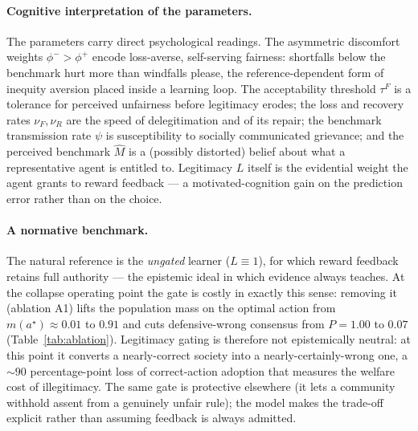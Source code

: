 \documentclass[11pt]{article}
\newcommand{\1}{\mathbf{1}}
\begin{document}
\paragraph{Cognitive interpretation of the parameters.}
The parameters carry direct psychological readings. The asymmetric discomfort
weights $\phi^->\phi^+$ encode loss-averse, self-serving fairness: shortfalls
below the benchmark hurt more than windfalls please, the reference-dependent form
of inequity aversion \citep{FehrSchmidt1999} placed inside a learning loop. The
acceptability threshold $\tau^F$ is a tolerance for perceived unfairness before
legitimacy erodes; the loss and recovery rates $\nu_F,\nu_R$ are the speed of
delegitimation and of its repair; the benchmark transmission rate $\psi$ is
susceptibility to socially communicated grievance; and the perceived benchmark
$\hat M$ is a (possibly distorted) belief about what a representative agent is
entitled to. Legitimacy $L$ itself is the evidential weight the agent grants to
reward feedback --- a motivated-cognition gain on the prediction error rather
than on the choice.

\paragraph{A normative benchmark.}
The natural reference is the \emph{ungated} learner ($L\equiv1$), for which reward
feedback retains full authority --- the epistemic ideal in which evidence always
teaches. At the collapse operating point the gate is costly in exactly this
sense: removing it (ablation A1) lifts the population mass on the optimal action
from $m(a^\star)\approx0.01$ to $0.91$ and cuts defensive-wrong consensus from
$P=1.00$ to $0.07$ (Table~\ref{tab:ablation}). Legitimacy gating is therefore not
epistemically neutral: at this point it converts a nearly-correct society into a
nearly-certainly-wrong one, a $\sim\!90$ percentage-point loss of correct-action
adoption that measures the welfare cost of illegitimacy. The same gate is
protective elsewhere (it lets a community withhold assent from a genuinely unfair
rule); the model makes the trade-off explicit rather than assuming feedback is
always admitted.
\end{document}
